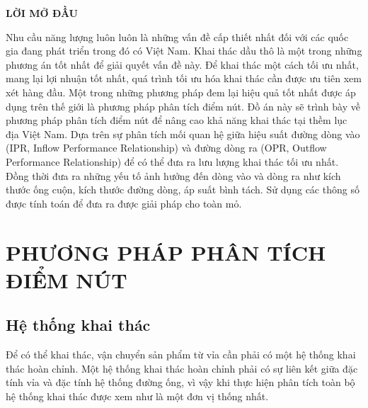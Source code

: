 \documentclass[12pt,a4paper]{report}
\begin{document}
\newpage
\begin{center}
	\centering
	\textbf{LỜI MỞ ĐẦU}
\end{center}
Nhu cầu năng lượng luôn luôn là những vấn đề cấp thiết nhất đối với các quốc gia đang phát triển trong đó có Việt Nam. Khai thác dầu thô là một trong những phương án tốt nhất để giải quyết vấn đề này. Để khai thác một cách tối ưu nhất, mang lại lợi nhuận tốt nhất, quá trình tối ưu hóa khai thác cần được ưu tiên xem xét hàng đầu. Một trong những phương pháp đem lại hiệu quả tốt nhất được áp dụng trên thế giới là phương pháp phân tích điểm nút. Đồ án này sẽ trình bày về phương pháp phân tích điểm nút để nâng cao khả năng khai thác tại thềm lục địa Việt Nam. Dựa trên sự phân tích mối quan hệ giữa hiệu suất đường dòng vào (IPR, Inflow Performance Relationship) và đường dòng ra (OPR, Outflow Performance Relationship) để có thể đưa ra lưu lượng khai thác tối ưu nhất. Đồng thời đưa ra những yếu tố ảnh hưởng đến dòng vào và dòng ra như kích thước ống cuộn, kích thước đường dòng, áp suất bình tách. Sử dụng các thông số được tính toán để đưa ra được giải pháp cho toàn mỏ.

\tableofcontents
{}

\listoffigures
{}

\listoftables
{}

\printnomenclature
{}

\clearpage
{}
\newpage

\chapter{PHƯƠNG PHÁP PHÂN TÍCH ĐIỂM NÚT}
\section{Hệ thống khai thác}
Để có thể khai thác, vận chuyển sản phẩm từ vỉa cần phải có một hệ thống khai thác hoàn chỉnh. Một hệ thống khai thác hoàn chỉnh phải có sự liên kết giữa đặc tính vỉa và đặc tính hệ thống đường ống, vì vậy khi thực hiện phân tích toàn bộ hệ thống khai thác được xem như là một đơn vị thống nhất.
\end{document}
